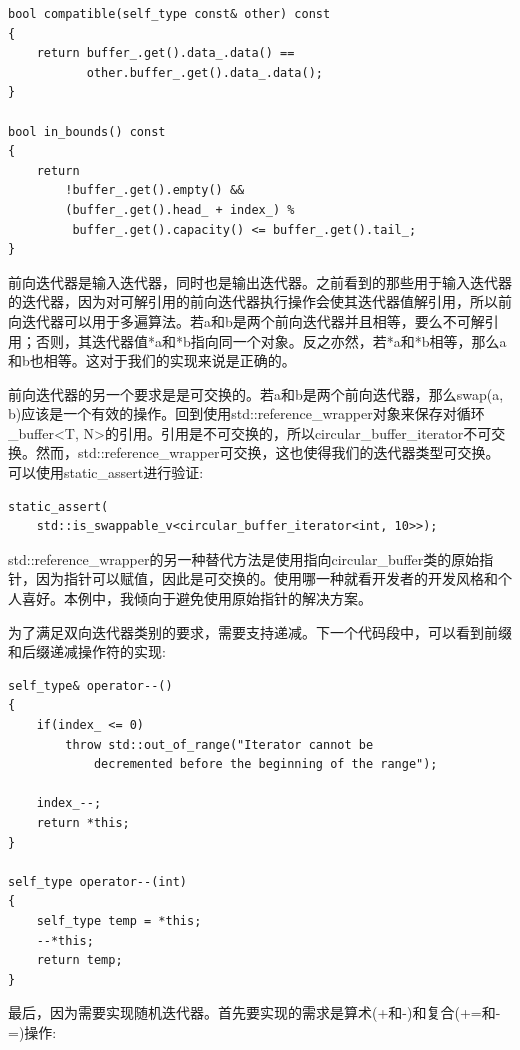\begin{lstlisting}[style=styleCXX]
bool compatible(self_type const& other) const
{
	return buffer_.get().data_.data() ==
		   other.buffer_.get().data_.data();
}

bool in_bounds() const
{
	return
		!buffer_.get().empty() &&
		(buffer_.get().head_ + index_) %
		 buffer_.get().capacity() <= buffer_.get().tail_;
}
\end{lstlisting}

前向迭代器是输入迭代器，同时也是输出迭代器。之前看到的那些用于输入迭代器的迭代器，因为对可解引用的前向迭代器执行操作会使其迭代器值解引用，所以前向迭代器可以用于多遍算法。若a和b是两个前向迭代器并且相等，要么不可解引用；否则，其迭代器值*a和*b指向同一个对象。反之亦然，若*a和*b相等，那么a和b也相等。这对于我们的实现来说是正确的。

前向迭代器的另一个要求是是可交换的。若a和b是两个前向迭代器，那么swap(a, b)应该是一个有效的操作。回到使用std::reference\_wrapper对象来保存对循环\_buffer<T, N>的引用。引用是不可交换的，所以circular\_buffer\_iterator不可交换。然而，std::reference\_wrapper可交换，这也使得我们的迭代器类型可交换。可以使用static\_assert进行验证:

\begin{lstlisting}[style=styleCXX]
static_assert(
	std::is_swappable_v<circular_buffer_iterator<int, 10>>);
\end{lstlisting}

\begin{tcolorbox}[breakable,enhanced jigsaw,colback=blue!5!white,colframe=blue!75!black,title={重要的Note}]
std::reference\_wrapper的另一种替代方法是使用指向circular\_buffer类的原始指针，因为指针可以赋值，因此是可交换的。使用哪一种就看开发者的开发风格和个人喜好。本例中，我倾向于避免使用原始指针的解决方案。
\end{tcolorbox}

为了满足双向迭代器类别的要求，需要支持递减。下一个代码段中，可以看到前缀和后缀递减操作符的实现:

\begin{lstlisting}[style=styleCXX]
self_type& operator--()
{
	if(index_ <= 0)
		throw std::out_of_range("Iterator cannot be
			decremented before the beginning of the range");
			
	index_--;
	return *this;
}

self_type operator--(int)
{
	self_type temp = *this;
	--*this;
	return temp;
}
\end{lstlisting}

最后，因为需要实现随机迭代器。首先要实现的需求是算术(+和-)和复合(+=和-=)操作:

